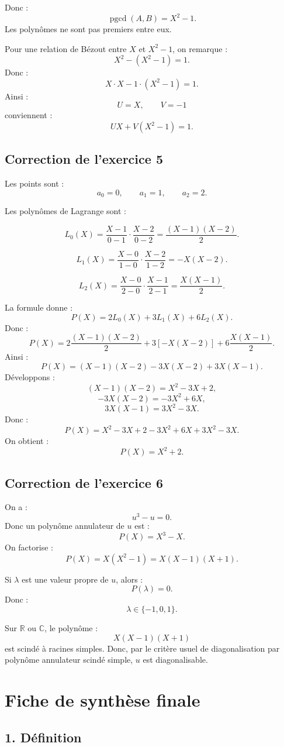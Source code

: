 \documentclass[11pt,a4paper]{article}
\newcommand{\R}{\mathbb R}
\newcommand{\C}{\mathbb C}
\newcommand{\pgcd}{\operatorname{pgcd}}
\begin{document}
Donc :
\[
\pgcd(A,B)=X^2-1.
\]
Les polynômes ne sont pas premiers entre eux.

Pour une relation de Bézout entre \(X\) et \(X^2-1\), on remarque :
\[
X^2-(X^2-1)=1.
\]
Donc :
\[
X\cdot X-1\cdot(X^2-1)=1.
\]
Ainsi :
\[
U=X,
\qquad
V=-1
\]
conviennent :
\[
UX+V(X^2-1)=1.
\]

\subsection*{Correction de l'exercice 5}

Les points sont :
\[
a_0=0,\qquad a_1=1,\qquad a_2=2.
\]

Les polynômes de Lagrange sont :

\[
L_0(X)=\frac{X-1}{0-1}\cdot\frac{X-2}{0-2}
=
\frac{(X-1)(X-2)}{2}.
\]

\[
L_1(X)=\frac{X-0}{1-0}\cdot\frac{X-2}{1-2}
=
-X(X-2).
\]

\[
L_2(X)=\frac{X-0}{2-0}\cdot\frac{X-1}{2-1}
=
\frac{X(X-1)}2.
\]

La formule donne :
\[
P(X)=2L_0(X)+3L_1(X)+6L_2(X).
\]
Donc :
\[
P(X)=
2\frac{(X-1)(X-2)}2
+
3[-X(X-2)]
+
6\frac{X(X-1)}2.
\]
Ainsi :
\[
P(X)=(X-1)(X-2)-3X(X-2)+3X(X-1).
\]
Développons :
\[
(X-1)(X-2)=X^2-3X+2,
\]
\[
-3X(X-2)=-3X^2+6X,
\]
\[
3X(X-1)=3X^2-3X.
\]
Donc :
\[
P(X)=X^2-3X+2-3X^2+6X+3X^2-3X.
\]
On obtient :
\[
P(X)=X^2+2.
\]

\subsection*{Correction de l'exercice 6}

On a :
\[
u^3-u=0.
\]
Donc un polynôme annulateur de \(u\) est :
\[
P(X)=X^3-X.
\]
On factorise :
\[
P(X)=X(X^2-1)=X(X-1)(X+1).
\]

Si \(\lambda\) est une valeur propre de \(u\), alors :
\[
P(\lambda)=0.
\]
Donc :
\[
\lambda\in\{-1,0,1\}.
\]

Sur \(\R\) ou \(\C\), le polynôme :
\[
X(X-1)(X+1)
\]
est scindé à racines simples.  
Donc, par le critère usuel de diagonalisation par polynôme annulateur scindé simple, \(u\) est diagonalisable.

\newpage
\section{Fiche de synthèse finale}

\subsection*{1. Définition}
\end{document}
